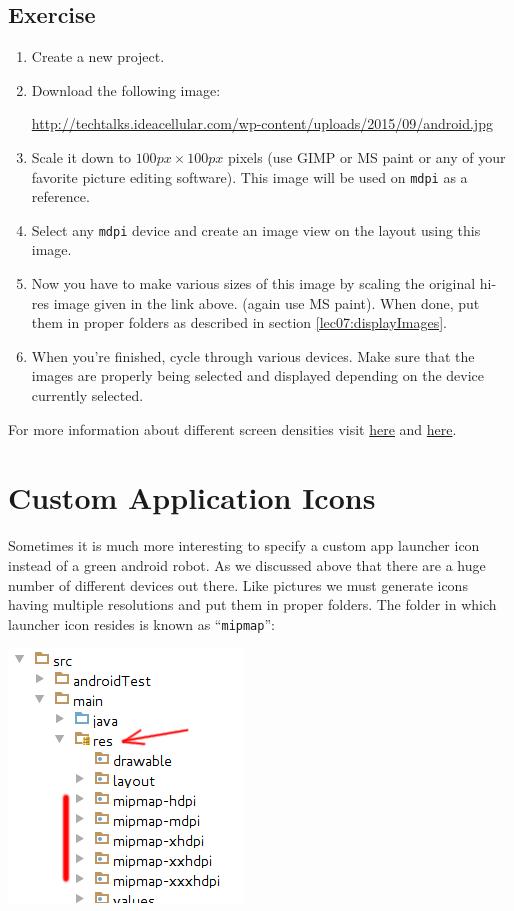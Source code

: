 \subsection{Exercise}
\begin{enumerate}
	\item Create a new project.
	\item Download the following image:
	
	\url{http://techtalks.ideacellular.com/wp-content/uploads/2015/09/android.jpg}
	
	\item Scale it down to $100px \times 100px$ pixels (use GIMP or MS paint or any of your favorite picture editing software). This image will be used on \texttt{mdpi} as a reference.
	
	\item Select any \texttt{mdpi} device and create an image view on the layout using this image.
	
	\item Now you have to make various sizes of this image by scaling the original hi-res image given in the link above. (again use MS paint). When done, put them in proper folders as described in section \ref{lec07:displayImages}.
	
	\item When you're finished, cycle through various devices. Make sure that the images are properly being selected and displayed depending on the device currently selected.	
\end{enumerate}

\vskip 5mm
For more information about different screen densities visit \href{https://developer.android.com/training/basics/supporting-devices/screens.html}{here} and \href{https://developer.android.com/training/multiscreen/screendensities.html}{here}.


\section{Custom Application Icons}
Sometimes it is much more interesting to specify a custom app launcher icon instead of a green android robot. As we discussed above that there are a huge number of different devices out there. Like pictures we must generate icons having multiple resolutions and put them in proper folders. The folder in which launcher icon resides is known as ``\texttt{mipmap}'':

\begin{center}
	\includegraphics[scale=0.4]{chapters/ch06/images/22}
\end{center}

